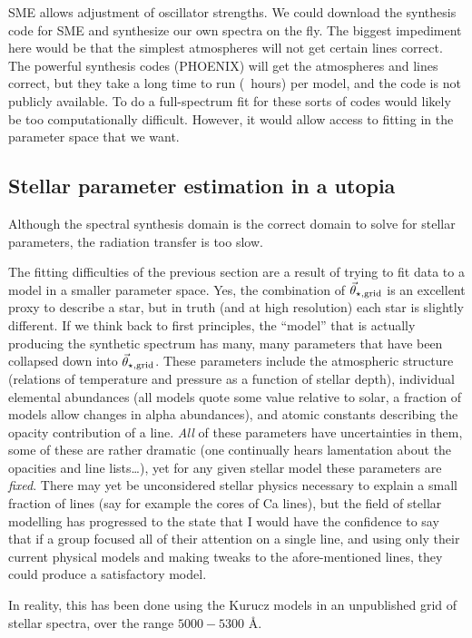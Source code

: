 \documentclass[preprint]{aastex} %
\newcommand{\vt}{\vec{\theta}}
\newcommand{\vg}{\vt_{\star, {\rm grid}}}
\begin{document}
SME allows adjustment of oscillator strengths. We could download the synthesis code for SME and synthesize our own spectra on the fly. The biggest impediment here would be that the simplest atmospheres will not get certain lines correct. The powerful synthesis codes (PHOENIX) will get the atmospheres and lines correct, but they take a long time to run (~hours) per model, and the code is not publicly available. To do a full-spectrum fit for these sorts of codes would likely be too computationally difficult. However, it would allow access to fitting in the parameter space that we want.

\subsection{Stellar parameter estimation in a utopia}

Although the spectral synthesis domain is the correct domain to solve for stellar parameters, the radiation transfer is too slow.

The fitting difficulties of the previous section are a result of trying to fit data to a model in a smaller parameter space. Yes, the combination of $\vg$ is an excellent proxy to describe a star, but in truth (and at high resolution) each star is slightly different. If we think back to first principles, the ``model'' that is actually producing the synthetic spectrum has many, many parameters that have been collapsed down into $\vg$. These parameters include the atmospheric structure (relations of temperature and pressure as a function of stellar depth), individual elemental abundances (all models quote some value relative to solar, a fraction of models allow changes in alpha abundances), and atomic constants describing the opacity contribution of a line. \emph{All} of these parameters have uncertainties in them, some of these are rather dramatic (one continually hears lamentation about the opacities and line lists\dots), yet for any given stellar model these parameters are \emph{fixed}. There may yet be unconsidered stellar physics necessary to explain a small fraction of lines (say for example the cores of Ca lines), but the field of stellar modelling has progressed to the state that I would have the confidence to say that if a group focused all of their attention on a single line, and using only their current physical models and making tweaks to the afore-mentioned lines, they could produce a satisfactory model.

In reality, this has been done using the Kurucz models in an unpublished grid of stellar spectra, over the range $5000 - 5300$ \AA.
\end{document}
